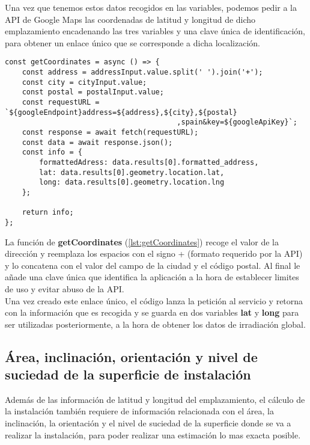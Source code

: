 Una vez que tenemos estos datos recogidos en las variables, podemos pedir a la API de Google Maps las coordenadas de latitud y longitud de dicho emplazamiento encadenando las tres variables y una clave única de identificación,  para obtener un enlace único que se corresponde a dicha localización.\\

\begin{lstlisting}[style=ES6, label={lst:getCoordinates}, caption={Función encargada de solicitar los datos a la API}]
const getCoordinates = async () => {
	const address = addressInput.value.split(' ').join('+');
	const city = cityInput.value;
	const postal = postalInput.value;
	const requestURL = `${googleEndpoint}address=${address},${city},${postal}
										,spain&key=${googleApiKey}`;
	const response = await fetch(requestURL);
	const data = await response.json();
	const info = {
		formattedAdress: data.results[0].formatted_address,
		lat: data.results[0].geometry.location.lat,
		long: data.results[0].geometry.location.lng
	};

	return info;
};
\end{lstlisting}

La función de \textbf{getCoordinates} (\ref{lst:getCoordinates}) recoge el valor de la dirección y reemplaza los espacios con el signo + (formato requerido por la API) y lo concatena con el valor del campo de la ciudad y el código postal. Al final le añade una clave única que identifica la aplicación a la hora de establecer limites de uso y evitar abuso de la API.\\

Una vez creado este enlace único, el código lanza la petición al servicio y retorna con la información que es recogida y se guarda en dos variables \textbf{lat} y \textbf{long} para ser utilizadas posteriormente, a la hora de obtener los datos de irradiación global.

\subsection{Área, inclinación, orientación y nivel de suciedad de la superficie de instalación}

Además de las información de latitud y longitud del emplazamiento, el cálculo de la instalación también requiere de información relacionada con el área, la inclinación, la orientación y el nivel de suciedad de la superficie donde se va a realizar la instalación, para poder realizar una estimación lo mas exacta posible.

